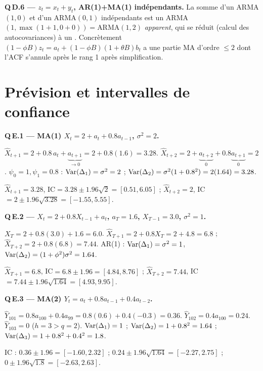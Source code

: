 \documentclass[11pt]{article}
\begin{document}
\textbf{Q\,D.6 --- $z_t=x_t+y_t$, AR(1)+MA(1) indépendants.}
La somme d'un ARMA$(1,0)$ et d'un ARMA$(0,1)$ indépendants est un ARMA$(1,\max(1+1,0+0))=$ARMA$(1,2)$
\emph{apparent}, qui se réduit (calcul des autocovariances) à un .
Concrètement $(1-\phi B)z_t=a_t+(1-\phi B)(1+\theta B)b_t$ a une partie MA d'ordre $\le2$ dont
l'ACF s'annule après le rang 1 après simplification.

\section{Prévision et intervalles de confiance}

\textbf{Q\,E.1 --- MA(1) $X_t=2+a_t+0.8a_{t-1}$, $\sigma^2=2$.}
\begin{etapes}
$\widehat X_{t+1}=2+0.8\,a_t+\underbrace{a_{t+1}}_{\to0}=2+0.8(1.6)=3.28$.
$\widehat X_{t+2}=2+\underbrace{a_{t+2}}_{0}+0.8\underbrace{a_{t+1}}_{0}=2$.
$\psi_0=1,\psi_1=0.8$ : $\operatorname{Var}(\Delta_1)=\sigma^2=2$ ;
$\operatorname{Var}(\Delta_2)=\sigma^2(1+0.8^2)=2(1.64)=3.28$.
\end{etapes}
\begin{reponse}$\widehat X_{t+1}=3.28$, IC$=3.28\pm1.96\sqrt2=[0.51,6.05]$ ;
$\widehat X_{t+2}=2$, IC$=2\pm1.96\sqrt{3.28}=[-1.55,5.55]$.\end{reponse}

\textbf{Q\,E.2 --- $X_t=2+0.8X_{t-1}+a_t$, $a_T=1.6$, $X_{T-1}=3.0$, $\sigma^2=1$.}
\begin{etapes}
$X_T=2+0.8(3.0)+1.6=6.0$.
$\widehat X_{T+1}=2+0.8X_T=2+4.8=6.8$ ; $\widehat X_{T+2}=2+0.8(6.8)=7.44$.
AR(1) : $\operatorname{Var}(\Delta_1)=\sigma^2=1$, $\operatorname{Var}(\Delta_2)=(1+\phi^2)\sigma^2=1.64$.
\end{etapes}
\begin{reponse}$\widehat X_{T+1}=6.8$, IC$=6.8\pm1.96=[4.84,8.76]$ ;
$\widehat X_{T+2}=7.44$, IC$=7.44\pm1.96\sqrt{1.64}=[4.93,9.95]$.\end{reponse}

\textbf{Q\,E.3 --- MA(2) $Y_t=a_t+0.8a_{t-1}+0.4a_{t-2}$.}
\begin{etapes}
$\widehat Y_{101}=0.8a_{100}+0.4a_{99}=0.8(0.6)+0.4(-0.3)=0.36$.
$\widehat Y_{102}=0.4a_{100}=0.24$. $\widehat Y_{103}=0$ ($h=3>q=2$).
$\operatorname{Var}(\Delta_1)=1$ ; $\operatorname{Var}(\Delta_2)=1+0.8^2=1.64$ ; $\operatorname{Var}(\Delta_3)=1+0.8^2+0.4^2=1.8$.
\end{etapes}
\begin{reponse}IC : $0.36\pm1.96=[-1.60,2.32]$ ; $0.24\pm1.96\sqrt{1.64}=[-2.27,2.75]$ ;
$0\pm1.96\sqrt{1.8}=[-2.63,2.63]$.\end{reponse}
\end{document}
